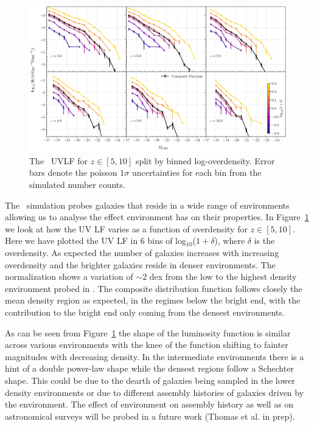 \begin{figure}
	\centering
	\includegraphics[width=\textwidth]{./figures/UVLF_env}
	\caption{The \flares\, UVLF for $z \in [5,10]$ split by
		binned log-overdensity. Error bars denote the poisson $1\sigma$ uncertainties for
		each bin from the simulated number counts. \label{fig: UVLF env}} 
\end{figure}
The \flares\, simulation probes galaxies that reside in a wide range of environments allowing us to analyse the effect environment has on their properties. In Figure~\ref{fig: UVLF env} we look at how the UV LF varies as a function of overdensity for $z \in [5,10]$. Here we have plotted the UV LF in 6 bins of log$_{10}$($1+\delta$), where $\delta$ is the overdensity. As expected the number of galaxies increases with increasing overdensity and the brighter galaxies reside in denser environments. The normalization shows a variation of $\sim2$ dex from the low to the highest density environment probed in \flares. The composite distribution function follows closely the mean density region as expected, in the regimes below the bright end, with the contribution to the bright end only coming from the densest environments. 

As can be seen from Figure~\ref{fig: UVLF env} the shape of the luminosity function is similar across various environments with the knee of the function shifting to fainter magnitudes with decreasing density. In the intermediate environments there is a hint of a double power-law shape while the densest regions follow a Schechter shape. This could be due to the dearth of galaxies being sampled in the lower density environments or due to different assembly histories of galaxies driven by the environment. The effect of environment on assembly history as well as on astronomical surveys will be probed in a future work (Thomas et al. in prep). 

